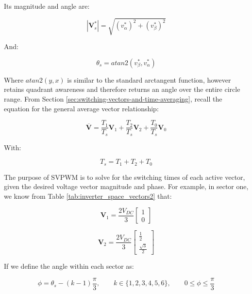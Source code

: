 \documentclass{article}
\begin{document}
Its magnitude and angle are:

\begin{equation}
    |\mathbf{V}_s^*| = \sqrt{(v_\alpha^*)^2 + (v_\beta^*)^2}
\end{equation}

And:

\begin{equation}
    \theta_s = atan2(v_\beta^*, v_\alpha^*)
\end{equation}

Where $atan2(y, x)$ is similar to the standard arctangent function, however retains quadrant awareness and therefore returns an angle over the entire circle range. From Section \ref{sec:switching-vectors-and-time-averaging}, recall the equation for the general average vector relationship:

\begin{equation}
    \overline{\mathbf{V}} = \frac{T_1}{T_s}\mathbf{V}_1 + \frac{T_2}{T_s}\mathbf{V}_2 + \frac{T_0}{T_s}\mathbf{V}_0 
\end{equation}

With:

\begin{equation}
    T_s = T_1 + T_2 + T_0
\end{equation}

The purpose of SVPWM is to solve for the switching times of each active vector, given the desired voltage vector magnitude and phase. For example, in sector one, we know from Table \ref{tab:inverter_space_vectors2} that:

\begin{equation}
    \mathbf{V}_1 = \frac{2V_{DC}}{3}
    \begin{bmatrix}
        1 \\
        0
    \end{bmatrix}
\end{equation}

\begin{equation}
    \mathbf{V}_2 = \frac{2V_{DC}}{3}
    \begin{bmatrix}
        \frac{1}{2} \\
        \frac{\sqrt{3}}{2}
    \end{bmatrix}
\end{equation}

If we define the angle within each sector as:

\begin{equation}
    \phi = \theta_s - (k - 1)\frac{\pi}{3}, \qquad
    k \in \{1, 2, 3, 4, 5, 6\}, \qquad
    0 \leq \phi \leq \frac{\pi}{3}
\end{equation}
\end{document}
